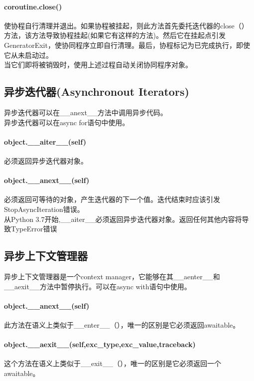 \documentclass[10pt,UTF8]{ctexart}
\begin{document}
\begin{flushleft}
\paragraph{coroutine.close()}使协程自行清理并退出。如果协程被挂起，则此方法首先委托迭代器的close（）方法，该方法导致协程挂起(如果它有这样的方法)。然后它在挂起点引发GeneratorExit，使协同程序立即自行清理。最后，协程标记为已完成执行，即使它从未启动过。\\
\indent 当它们即将被销毁时，使用上述过程自动关闭协同程序对象。
\subsection{异步迭代器(Asynchronout Iterators)}
异步迭代器可以在__anext__方法中调用异步代码。\\
\indent 异步迭代器可以在async for语句中使用。
\paragraph{object.__aiter__(self)}必须返回异步迭代器对象。
\paragraph{object.__anext__(self)}
必须返回可等待的对象，产生迭代器的下一个值。迭代结束时应该引发StopAsyncIteration错误。\\
\indent 从Python 3.7开始,__aiter__必须返回异步迭代器对象。返回任何其他内容将导致TypeError错误
\subsection{异步上下文管理器}
异步上下文管理器是一个context manager，它能够在其__aenter__和__aexit__方法中暂停执行。可以在async with语句中使用。
\paragraph{object.__anext__(self)}此方法在语义上类似于__enter__（），唯一的区别是它必须返回awaitable。
\paragraph{object.__aexit__(self,exc_type,exc_value,traceback)}
这个方法在语义上类似于__exit__（），唯一的区别是它必须返回一个awaitable。
\end{flushleft}
\end{document}
